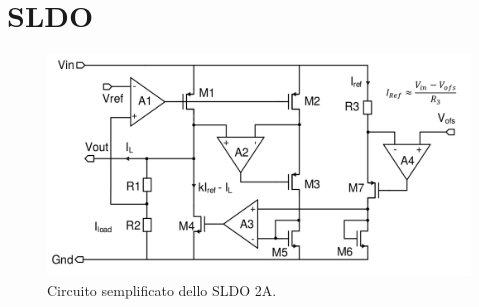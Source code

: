 \section{SLDO}

\begin{figure}
\centering
\includegraphics[scale=.3]{Immagini/SLDO2A}
\caption{Circuito semplificato dello SLDO 2A.}
\label{SLDO2A}
\end{figure}

